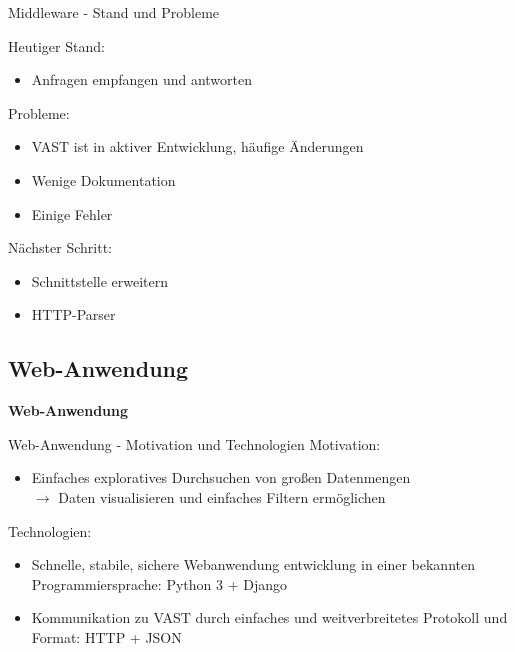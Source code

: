 \documentclass[9pt]{beamer}
\begin{document}
\begin{frame}{Middleware - Stand und Probleme}{}

	Heutiger Stand:
	\begin{itemize}
		\item Anfragen empfangen und antworten
	\end{itemize}

	Probleme:
	\begin{itemize}
		\item VAST ist in aktiver Entwicklung, häufige Änderungen
		\item Wenige Dokumentation
		\item Einige Fehler
	\end{itemize}
	
	Nächster Schritt:
	\begin{itemize}
		\item Schnittstelle erweitern
		\item HTTP-Parser
	\end{itemize}

\end{frame}

\subsection{Web-Anwendung}

	\begin{frame}{}
		\begin{center}
			\LARGE \textbf{Web-Anwendung}
		\end{center}
	\end{frame}

\begin{frame}{Web-Anwendung - Motivation und Technologien}{}
	Motivation:
	\begin{itemize}
		\item Einfaches exploratives Durchsuchen von großen Datenmengen\\
			$\rightarrow$ Daten visualisieren und einfaches Filtern ermöglichen
	\end{itemize}
	Technologien:
	\begin{itemize}
		\item Schnelle, stabile, sichere Webanwendung entwicklung in einer bekannten Programmiersprache:  Python 3 + Django
			
		\item Kommunikation zu VAST durch einfaches  und weitverbreitetes Protokoll und Format: HTTP + JSON
	\end{itemize}
\end{frame}
\end{document}
